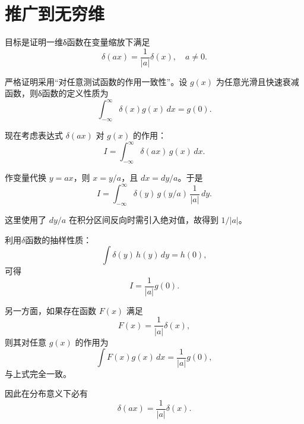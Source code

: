 ﻿%
\section{推广到无穷维}

\begin{solution}[δ函数缩放性质]

\answer
目标是证明一维δ函数在变量缩放下满足
\[
\delta(ax)=\frac{1}{|a|}\delta(x), \quad a\neq 0.
\]

严格证明采用“对任意测试函数的作用一致性”。设 $g(x)$ 为任意光滑且快速衰减函数，则δ函数的定义性质为
\[
\int_{-\infty}^{\infty}\delta(x)g(x)\,dx=g(0).
\]

现在考虑表达式 $\delta(ax)$ 对 $g(x)$ 的作用：
\[
I=\int_{-\infty}^{\infty}\delta(ax)\,g(x)\,dx.
\]

作变量代换 $y=ax$，则 $x=y/a$，且 $dx=dy/a$。于是
\[
I=\int_{-\infty}^{\infty}\delta(y)\,g(y/a)\,\frac{1}{|a|}\,dy.
\]

这里使用了 $dy/a$ 在积分区间反向时需引入绝对值，故得到 $1/|a|$。

利用$ \delta $函数的抽样性质：
\[
\int \delta(y)\,h(y)\,dy = h(0),
\]
可得
\[
I=\frac{1}{|a|}g(0).
\]

另一方面，如果存在函数 $F(x)$ 满足
\[
F(x)=\frac{1}{|a|}\delta(x),
\]
则其对任意 $g(x)$ 的作用为
\[
\int F(x)g(x)\,dx=\frac{1}{|a|}g(0),
\]
与上式完全一致。

因此在分布意义下必有
\[
\delta(ax)=\frac{1}{|a|}\delta(x).
\]

\end{solution}



